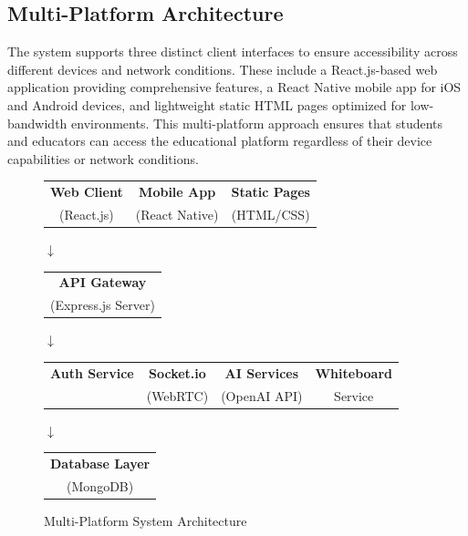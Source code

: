 \documentclass[onecolumn]{IEEEtran}
\begin{document}
\subsection{Multi-Platform Architecture}

The system supports three distinct client interfaces to ensure accessibility across different devices and network conditions. These include a React.js-based web application providing comprehensive features, a React Native mobile app for iOS and Android devices, and lightweight static HTML pages optimized for low-bandwidth environments. This multi-platform approach ensures that students and educators can access the educational platform regardless of their device capabilities or network conditions.

\begin{figure}[h]
\centering
\begin{tabular}{|c|c|c|}
\hline
\textbf{Web Client} & \textbf{Mobile App} & \textbf{Static Pages} \\
(React.js) & (React Native) & (HTML/CSS) \\
\hline
\end{tabular}

\vspace{0.3cm}
$\downarrow$
\vspace{0.3cm}

\begin{tabular}{|c|}
\hline
\textbf{API Gateway} \\
(Express.js Server) \\
\hline
\end{tabular}

\vspace{0.3cm}
$\downarrow$
\vspace{0.3cm}

\begin{tabular}{|c|c|c|c|}
\hline
\textbf{Auth Service} & \textbf{Socket.io} & \textbf{AI Services} & \textbf{Whiteboard} \\
& (WebRTC) & (OpenAI API) & Service \\
\hline
\end{tabular}

\vspace{0.3cm}
$\downarrow$
\vspace{0.3cm}

\begin{tabular}{|c|}
\hline
\textbf{Database Layer} \\
(MongoDB) \\
\hline
\end{tabular}
\begin{center}
    \caption{Multi-Platform System Architecture}
\end{center}

\label{fig:architecture}
\end{figure}
\end{document}
